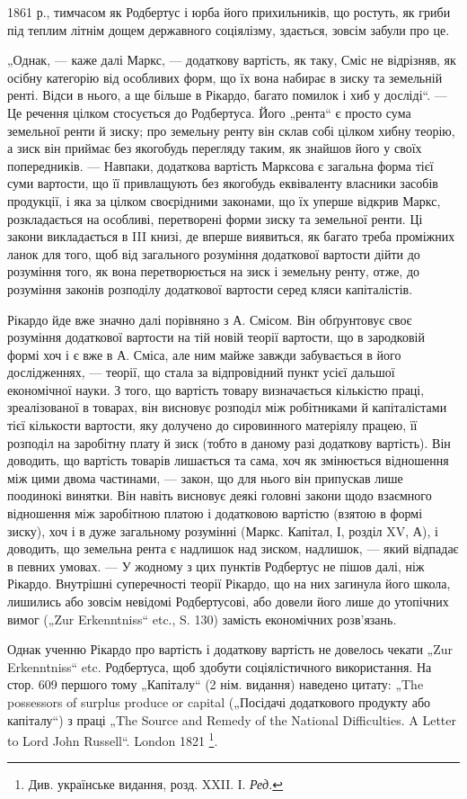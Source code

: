 \parcont{}  %
1861 р., тимчасом як Родбертус і юрба його прихильників, що ростуть,
як гриби під теплим літнім дощем державного соціялізму, здається, зовсім
забули про це.

„Однак, — каже далі Маркс, — додаткову вартість, як таку, Сміс не
відрізняв, як осібну категорію від особливих форм, що їх вона набирає
в зиску та земельній ренті. Відси в нього, а ще більше в Рікардо, багато
помилок і хиб у досліді“. — Це речення цілком стосується до Родбертуса.
Його „рента“ є просто сума земельної ренти й зиску; про земельну
ренту він склав собі цілком хибну теорію, а зиск він приймає без якогобудь
перегляду таким, як знайшов його у своїх попередників. — Навпаки,
додаткова вартість Марксова є загальна форма тієї суми вартости, що
її привлащують без якогобудь еквіваленту власники засобів продукції,
і яка за цілком своєрідними законами, що їх уперше відкрив Маркс,
розкладається на особливі, перетворені форми зиску та земельної ренти.
Ці закони викладається в III книзі, де вперше виявиться, як багато треба
проміжних ланок для того, щоб від загального розуміння додаткової
вартости дійти до розуміння того, як вона перетворюється на зиск і
земельну ренту, отже, до розуміння законів розподілу додаткової вартости
серед кляси капіталістів.

Рікардо йде вже значно далі порівняно з А. Смісом. Він обґрунтовує
своє розуміння додаткової вартости на тій новій теорії вартости, що в
зародковій формі хоч і є вже в А. Сміса, але ним майже завжди забувається
в його дослідженнях, — теорії, що стала за відпровідний пункт
усієї дальшої економічної науки. З того, що вартість товару визначається
кількістю праці, зреалізованої в товарах, він висновує розподіл між
робітниками й капіталістами тієї кількости вартости, яку долучено до
сировинного матеріялу працею, її розподіл на заробітну плату й зиск
(тобто в даному разі додаткову вартість). Він доводить, що вартість
товарів лишається та сама, хоч як змінюється відношення між цими двома
частинами, — закон, що для нього він припускав лише поодинокі винятки.
Він навіть висновує деякі головні закони щодо взаємного відношення між
заробітною платою і додатковою вартістю (взятою в формі зиску), хоч і в
дуже загальному розумінні (Маркс. Капітал, І, розділ XV, А), і доводить, що
земельна рента є надлишок над зиском, надлишок, — який відпадає в певних
умовах. — У жодному з цих пунктів Родбертус не пішов далі, ніж Рікардо.
Внутрішні суперечності теорії Рікардо, що на них загинула його школа, лишились
або зовсім невідомі Родбертусові, або довели його лише до утопічних
вимог („Zur Erkenntniss“ etc., S. 130) замість економічних розв’язань.

Однак ученню Рікардо про вартість і додаткову вартість не довелось
чекати „Zur Erkenntniss“ etc. Родбертуса, щоб здобути соціялістичного
використання. На стор. 609 першого тому „Капіталу“ (2 нім. видання)
наведено цитату: „The possessors of surplus produce or capital („Посідачі
додаткового продукту або капіталу“) з праці „The Source and Remedy of
the National Difficulties. A Letter to Lord John Russell“. London 1821 \footnote*{
Див. українське видання, розд. XXII. І. \emph{Ред.}
}.
\parbreak{}  %
